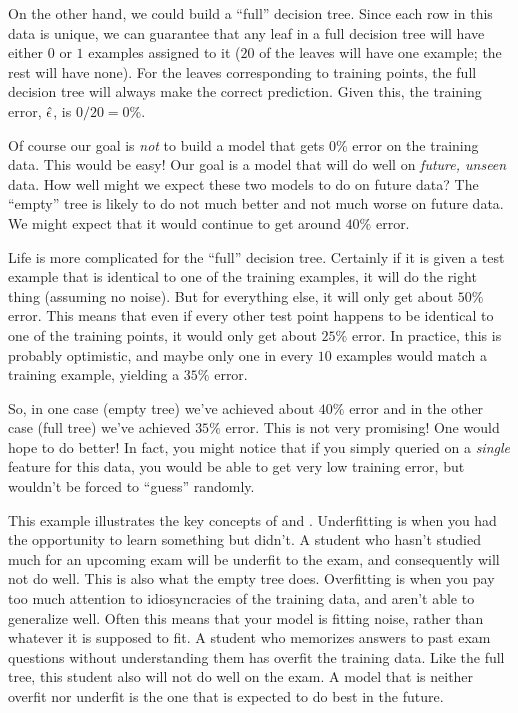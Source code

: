 
On the other hand, we could build a ``full'' decision tree.  Since
each row in this data is unique, we can guarantee that any leaf in a
full decision tree will have either $0$ or $1$ examples assigned to it
($20$ of the leaves will have one example; the rest will have none).
For the leaves corresponding to training points, the full decision
tree will always make the correct prediction.  
Given this, the training error, $\hat {\epsilon}$, is $0/20 = 0\%$.

Of course our goal is \emph{not} to build a model that gets $0\%$
error on the training data.  This would be easy!  Our goal is a model
that will do well on \emph{future, unseen} data.  How well might we
expect these two models to do on future data?  The ``empty'' tree is
likely to do not much better and not much worse on future data.  We
might expect that it would continue to get around $40\%$ error.

Life is more complicated for the ``full'' decision tree.  Certainly if
it is given a test example that is identical to one of the training
examples, it will do the right thing (assuming no noise).  But for
everything else, it will only get about $50\%$ error.  This means that
even if every other test point happens to be identical to one of the
training points, it would only get about $25\%$ error.  In practice,
this is probably optimistic, and maybe only one in every $10$ examples
would match a training example, yielding a $35\%$ error.


So, in one case (empty tree) we've achieved about $40\%$ error and in
the other case (full tree) we've achieved $35\%$ error.  This is not
very promising!  One would hope to do better!  In fact, you might
notice that if you simply queried on a \emph{single} feature for this
data, you would be able to get very low training error, but wouldn't
be forced to ``guess'' randomly.


This example illustrates the key concepts of 
and .  Underfitting is when you had the
opportunity to learn something but didn't.  A student who hasn't
studied much for an upcoming exam will be underfit to the exam, and
consequently will not do well.  This is also what the empty tree
does.  Overfitting is when you pay too much attention to
idiosyncracies of the training data, and aren't able to generalize
well.  Often this means that your model is fitting noise, rather than
whatever it is supposed to fit.  A student who memorizes answers to
past exam questions without understanding them has overfit the
training data.  Like the full tree, this student also will not do well
on the exam.  A model that is neither overfit nor underfit is the one
that is expected to do best in the future.

